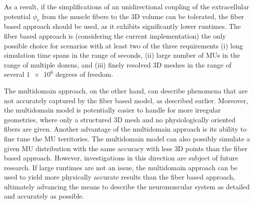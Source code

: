 As a result, if the simplifications of an unidirectional coupling of the extracellular potential $\phi_e$ from the muscle fibers to the 3D volume can be tolerated, the fiber based approach should be used, as it exhibits significantly lower runtimes. The fiber based approach is (considering the current implementation) the only possible choice for scenarios with at least two of the three requirements (i) long simulation time spans in the range of seconds, (ii) large number of MUs in the range of multiple dozens, and (iii) finely resolved 3D meshes in the range of several $\num{1e6}$ degrees of freedom.
 
The multidomain approach, on the other hand, can describe phenomena that are not accurately captured by the fiber based model, as described earlier.
Moreover, the multidomain model is potentially easier to handle for more irregular geometries, where only a structured 3D mesh and no physiologically oriented fibers are given. Another advantage of the multidomain approach is its ability to fine tune the MU territories. 
The multidomain model can also possibly simulate a given MU distribution with the same accuracy with less 3D points than the fiber based approach. However, investigations in this direction are subject of future research.
If large runtimes are not an issue, the multidomain approach can be used to yield more physically accurate results than the fiber based approach, ultimately advancing the means to describe the neuromuscular system as detailed and accurately as possible.







